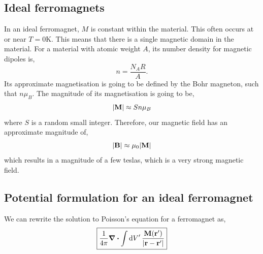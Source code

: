 \documentclass{book}
\begin{document}
\subsection{Ideal ferromagnets}
In an ideal ferromagnet, $M$ is constant within the material. This often occurs at or near $T = 0$K. This means that there is a single magnetic domain in the material. For a material with atomic weight $A$, its number density for magnetic dipoles is,
\begin{equation}
	n = \frac{N_AR}{A}.
\end{equation}
Its approximate magnetisation is going to be defined by the Bohr magneton, such that $n\mu_B$. The magnitude of its magnetisation is going to be,
\begin{equation}
	|\vb{M}| \approx S n \mu_B
\end{equation}
where $S$ is a random small integer. Therefore, our magnetic field has an approximate magnitude of,
\begin{equation}
	|\vb{B}| \approx \mu_0 |\vb{M}|
\end{equation}
which results in a magnitude of a few teslas, which is a very strong magnetic field.
\subsection{Potential formulation for an ideal ferromagnet}
We can rewrite the solution to Poisson's equation for a ferromagnet as,
\begin{equation}
	\boxed{\frac{1}{4\pi}\div{\int{\dd{V}'\frac{\vb{M}(\vb{r}')}{|\vb{r}- \vb{r}'|}}}}
\end{equation}
\end{document}
